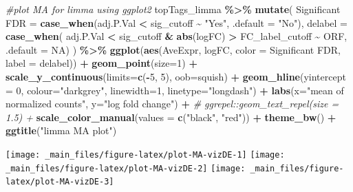 \documentclass[
]{book}
\newenvironment{Shaded}{\begin{snugshade}}{\end{snugshade}}
\newcommand{\AttributeTok}[1]{\textcolor[rgb]{0.13,0.29,0.53}{#1}}
\newcommand{\CommentTok}[1]{\textcolor[rgb]{0.56,0.35,0.01}{\textit{#1}}}
\newcommand{\ConstantTok}[1]{\textcolor[rgb]{0.56,0.35,0.01}{#1}}
\newcommand{\DecValTok}[1]{\textcolor[rgb]{0.00,0.00,0.81}{#1}}
\newcommand{\FunctionTok}[1]{\textcolor[rgb]{0.13,0.29,0.53}{\textbf{#1}}}
\newcommand{\NormalTok}[1]{#1}
\newcommand{\OtherTok}[1]{\textcolor[rgb]{0.56,0.35,0.01}{#1}}
\newcommand{\SpecialCharTok}[1]{\textcolor[rgb]{0.81,0.36,0.00}{\textbf{#1}}}
\newcommand{\StringTok}[1]{\textcolor[rgb]{0.31,0.60,0.02}{#1}}
\begin{document}
\begin{Shaded}
\begin{Highlighting}[]
\CommentTok{\#plot MA for limma using ggplot2}
\NormalTok{topTags\_limma }\SpecialCharTok{\%\textgreater{}\%}
  \FunctionTok{mutate}\NormalTok{(}
    \StringTok{\textasciigrave{}}\AttributeTok{Significant FDR}\StringTok{\textasciigrave{}} \OtherTok{=} \FunctionTok{case\_when}\NormalTok{(adj.P.Val }\SpecialCharTok{\textless{}}\NormalTok{ sig\_cutoff }\SpecialCharTok{\textasciitilde{}} \StringTok{"Yes"}\NormalTok{,}
                                  \AttributeTok{.default =} \StringTok{"No"}\NormalTok{),}
    \AttributeTok{delabel =} \FunctionTok{case\_when}\NormalTok{(}
\NormalTok{      adj.P.Val }\SpecialCharTok{\textless{}}\NormalTok{ sig\_cutoff }\SpecialCharTok{\&} \FunctionTok{abs}\NormalTok{(logFC) }\SpecialCharTok{\textgreater{}}\NormalTok{ FC\_label\_cutoff }\SpecialCharTok{\textasciitilde{}}\NormalTok{ ORF,}
      \AttributeTok{.default =} \ConstantTok{NA}\NormalTok{)}
\NormalTok{  ) }\SpecialCharTok{\%\textgreater{}\%} 
  \FunctionTok{ggplot}\NormalTok{(}\FunctionTok{aes}\NormalTok{(AveExpr, logFC, }\AttributeTok{color =} \StringTok{\textasciigrave{}}\AttributeTok{Significant FDR}\StringTok{\textasciigrave{}}\NormalTok{, }\AttributeTok{label =}\NormalTok{ delabel)) }\SpecialCharTok{+} 
    \FunctionTok{geom\_point}\NormalTok{(}\AttributeTok{size=}\DecValTok{1}\NormalTok{) }\SpecialCharTok{+} 
    \FunctionTok{scale\_y\_continuous}\NormalTok{(}\AttributeTok{limits=}\FunctionTok{c}\NormalTok{(}\SpecialCharTok{{-}}\DecValTok{5}\NormalTok{, }\DecValTok{5}\NormalTok{), }\AttributeTok{oob=}\NormalTok{squish) }\SpecialCharTok{+} 
    \FunctionTok{geom\_hline}\NormalTok{(}\AttributeTok{yintercept =} \DecValTok{0}\NormalTok{, }\AttributeTok{colour=}\StringTok{"darkgrey"}\NormalTok{, }\AttributeTok{linewidth=}\DecValTok{1}\NormalTok{, }\AttributeTok{linetype=}\StringTok{"longdash"}\NormalTok{) }\SpecialCharTok{+}
    \FunctionTok{labs}\NormalTok{(}\AttributeTok{x=}\StringTok{"mean of normalized counts"}\NormalTok{, }\AttributeTok{y=}\StringTok{"log fold change"}\NormalTok{) }\SpecialCharTok{+} 
    \CommentTok{\# ggrepel::geom\_text\_repel(size = 1.5) +}
    \FunctionTok{scale\_color\_manual}\NormalTok{(}\AttributeTok{values =} \FunctionTok{c}\NormalTok{(}\StringTok{"black"}\NormalTok{, }\StringTok{"red"}\NormalTok{)) }\SpecialCharTok{+}
    \FunctionTok{theme\_bw}\NormalTok{() }\SpecialCharTok{+} 
    \FunctionTok{ggtitle}\NormalTok{(}\StringTok{"limma MA plot"}\NormalTok{)}
\end{Highlighting}
\end{Shaded}

\texttt{[image: \_main\_files/figure-latex/plot-MA-vizDE-1]} \texttt{[image: \_main\_files/figure-latex/plot-MA-vizDE-2]} \texttt{[image: \_main\_files/figure-latex/plot-MA-vizDE-3]}
\end{document}
